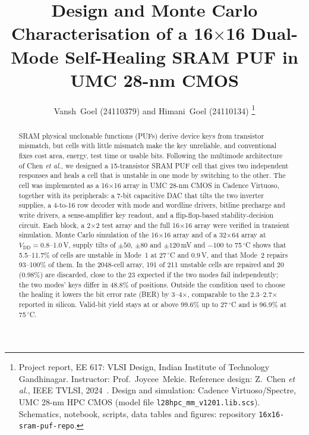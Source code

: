 \documentclass[journal]{IEEEtran}
\newcommand{\VDD}{V_{\mathrm{DD}}}
\begin{document}
\title{Design and Monte Carlo Characterisation of a 16$\times$16 Dual-Mode Self-Healing SRAM PUF in UMC 28-nm CMOS}

\author{Vansh~Goel (24110379) and Himani~Goel (24110134)
\thanks{Project report, EE 617: VLSI Design, Indian Institute of Technology Gandhinagar. Instructor: Prof.~Joycee~Mekie. Reference design: Z.~Chen \emph{et al.}, IEEE TVLSI, 2024~\cite{chen2024}. Design and simulation: Cadence Virtuoso/Spectre, UMC 28-nm HPC CMOS (model file \texttt{l28hpc\_mm\_v1201.lib.scs}). Schematics, notebook, scripts, data tables and figures: repository \texttt{16x16-sram-puf-repo}.}}

\maketitle

\begin{abstract}
SRAM physical unclonable functions (PUFs) derive device keys from transistor mismatch, but cells with little mismatch make the key unreliable, and conventional fixes cost area, energy, test time or usable bits. Following the multimode architecture of Chen \emph{et al.}, we designed a 15-transistor SRAM PUF cell that gives two independent responses and heals a cell that is unstable in one mode by switching to the other. The cell was implemented as a 16$\times$16 array in UMC 28-nm CMOS in Cadence Virtuoso, together with its peripherals: a 7-bit capacitive DAC that tilts the two inverter supplies, a 4-to-16 row decoder with mode and wordline drivers, bitline precharge and write drivers, a sense-amplifier key readout, and a flip-flop-based stability-decision circuit. Each block, a 2$\times$2 test array and the full 16$\times$16 array were verified in transient simulation. Monte Carlo simulation of the 16$\times$16 array and of a 32$\times$64 array at $\VDD=0.8$--1.0\,V, supply tilts of $\pm50$, $\pm80$ and $\pm120$\,mV and $-100$ to 75\,$^\circ$C shows that 5.5--11.7\% of cells are unstable in Mode~1 at 27\,$^\circ$C and 0.9\,V, and that Mode~2 repairs 93--100\% of them. In the 2048-cell array, 191 of 211 unstable cells are repaired and 20 (0.98\%) are discarded, close to the 23 expected if the two modes fail independently; the two modes' keys differ in 48.8\% of positions. Outside the condition used to choose the healing it lowers the bit error rate (BER) by 3--4$\times$, comparable to the 2.3--2.7$\times$ reported in silicon. Valid-bit yield stays at or above 99.6\% up to 27\,$^\circ$C and is 96.9\% at 75\,$^\circ$C.
\end{abstract}
\end{document}
